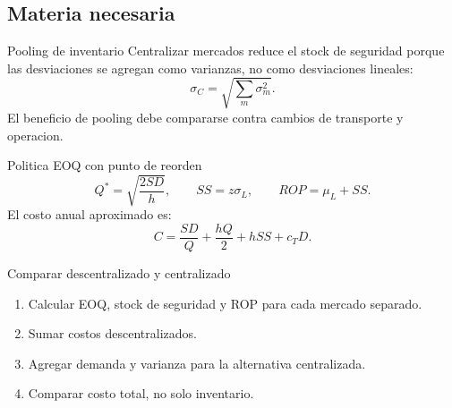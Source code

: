 \subsection{Materia necesaria}

\begin{definicion}{Pooling de inventario}
Centralizar mercados reduce el stock de seguridad porque las desviaciones se agregan como varianzas, no como desviaciones lineales:
\[
\sigma_C=\sqrt{\sum_m \sigma_m^2}.
\]
El beneficio de pooling debe compararse contra cambios de transporte y operacion.
\end{definicion}

\begin{formulas}{Politica EOQ con punto de reorden}
\[
Q^*=\sqrt{\frac{2SD}{h}},
\qquad
SS=z\sigma_L,
\qquad
ROP=\mu_L+SS.
\]
El costo anual aproximado es:
\[
C=\frac{SD}{Q}+\frac{hQ}{2}+hSS+c_TD.
\]
\end{formulas}

\begin{algoritmo}{Comparar descentralizado y centralizado}
\begin{enumerate}
    \item Calcular EOQ, stock de seguridad y ROP para cada mercado separado.
    \item Sumar costos descentralizados.
    \item Agregar demanda y varianza para la alternativa centralizada.
    \item Comparar costo total, no solo inventario.
\end{enumerate}
\end{algoritmo}
